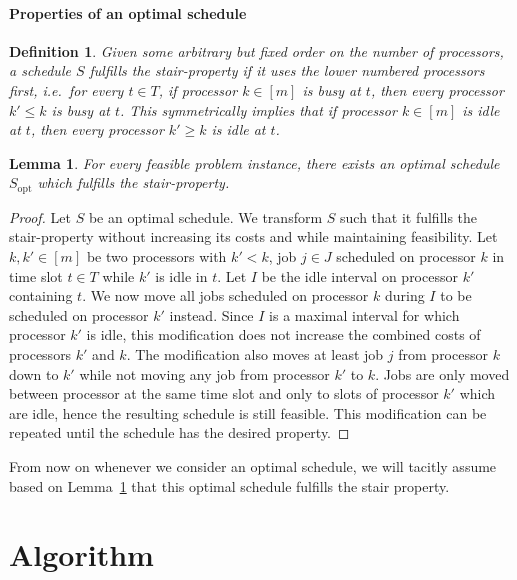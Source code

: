 \documentclass[a4paper]{article}
\DeclareMathOperator{\opt}{opt}
\newtheorem{lemma}[theorem]{Lemma}
\newtheorem{definition}[theorem]{Definition}
\begin{document}
\paragraph{Properties of an optimal schedule}
\begin{definition}\label{def:stair_property}
  Given some arbitrary but fixed order on the number of processors, a schedule $S$ fulfills the \emph{stair-property} if it uses the lower numbered processors first, i.e.\ for every $t \in T$, if processor $k \in [m]$ is busy at $t$, then every processor $k' \leq k$ is busy at $t$.
  This symmetrically implies that if processor $k \in [m]$ is idle at $t$, then every processor $k' \geq k$ is idle at $t$.
\end{definition}

\begin{lemma}\label{lemma:stair_property_opt}
  For every feasible problem instance, there exists an optimal schedule $S_{\opt}$ which fulfills the stair-property.
\end{lemma}
\begin{proof}
  Let $S$ be an optimal schedule.
  We transform $S$ such that it fulfills the stair-property without increasing its costs and while maintaining feasibility.
  Let $k, k' \in [m]$ be two processors with $k' < k$, job $j \in J$ scheduled on processor $k$ in time slot $t \in T$ while $k'$ is idle in $t$.
  Let $I$ be the idle interval on processor $k'$ containing $t$.
  We now move all jobs scheduled on processor $k$ during $I$ to be scheduled on processor $k'$ instead.
  Since $I$ is a maximal interval for which processor $k'$ is idle, this modification does not increase the combined costs of processors $k'$ and $k$.
  The modification also moves at least job $j$ from processor $k$ down to $k'$ while not moving any job from processor $k'$ to $k$.
  Jobs are only moved between processor at the same time slot and only to slots of processor $k'$ which are idle, hence the resulting schedule is still feasible.
  This modification can be repeated until the schedule has the desired property.
\end{proof}
From now on whenever we consider an optimal schedule, we will tacitly assume based on Lemma~\ref{lemma:stair_property_opt} that this optimal schedule fulfills the stair property.

\section{Algorithm}\label{section:algorithm}
\end{document}

